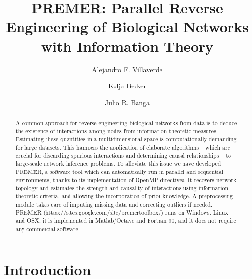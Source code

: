\documentclass{llncs}
\begin{document}
\title{PREMER: Parallel Reverse Engineering of Biological Networks with Information Theory}

\author{Alejandro F. Villaverde \and
	Kolja Becker \and
	Julio R. Banga}


\maketitle

\begin{abstract}
A common approach for reverse engineering biological networks from data is to deduce the existence of interactions among nodes from information theoretic measures. Estimating these quantities in a multidimensional space is computationally demanding for large datasets. This hampers the application of elaborate algorithms -- which are crucial for discarding spurious interactions and determining causal relationships -- to large-scale network inference problems. To alleviate this issue we have developed PREMER, a software tool which can automatically run in parallel and sequential environments, thanks to its implementation of OpenMP directives. It recovers network topology and estimates the strength and causality of interactions using information theoretic criteria, and allowing the incorporation of prior knowledge. A preprocessing module takes care of imputing missing data and correcting outliers if needed. PREMER (\url{https://sites.google.com/site/premertoolbox/}) runs on Windows, Linux and OSX, it is implemented in Matlab/Octave and Fortran 90, and it does not require any commercial software. 

\end{abstract}



\section{Introduction}
\label{sec:intro}    
\end{document}
